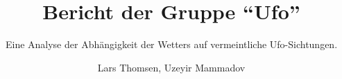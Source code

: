 \title{Bericht der Gruppe \enquote{Ufo}}
\subtitle{Eine Analyse der Abhängigkeit der Wetters auf vermeintliche Ufo-Sichtungen.}         %


\author{Lars Thomsen, Uzeyir Mammadov}

\begin{abstract}


\end{abstract}

\maketitle
